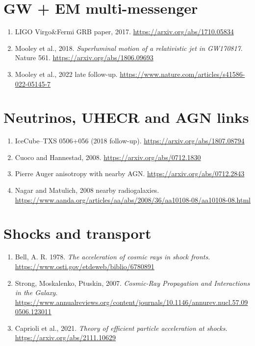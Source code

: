 \documentclass[11pt]{article}
\begin{document}
\section{GW + EM multi-messenger}
\begin{enumerate}
\item LIGO Virgo\&Fermi GRB paper, 2017. \url{https://arxiv.org/abs/1710.05834}
\item Mooley et al., 2018. \emph{Superluminal motion of a relativistic jet in GW170817}. Nature 561. \url{https://arxiv.org/abs/1806.09693}
\item Mooley et al., 2022 late follow-up. \url{https://www.nature.com/articles/s41586-022-05145-7}
\end{enumerate}

\section{Neutrinos, UHECR and AGN links}
\begin{enumerate}
\item IceCube--TXS 0506+056 (2018 follow-up). \url{https://arxiv.org/abs/1807.08794}
\item Cuoco and Hannestad, 2008. \url{https://arxiv.org/abs/0712.1830}
\item Pierre Auger anisotropy with nearby AGN. \url{https://arxiv.org/abs/0712.2843}
\item Nagar and Matulich, 2008 nearby radiogalaxies. \url{https://www.aanda.org/articles/aa/abs/2008/36/aa10108-08/aa10108-08.html}
\end{enumerate}

\section{Shocks and transport}
\begin{enumerate}
\item Bell, A. R. 1978. \emph{The acceleration of cosmic rays in shock fronts}. \url{https://www.osti.gov/etdeweb/biblio/6780891}
\item Strong, Moskalenko, Ptuskin, 2007. \emph{Cosmic-Ray Propagation and Interactions in the Galaxy}. \url{https://www.annualreviews.org/content/journals/10.1146/annurev.nucl.57.090506.123011}
\item Caprioli et al., 2021. \emph{Theory of efficient particle acceleration at shocks}. \url{https://arxiv.org/abs/2111.10629}
\end{enumerate}
\end{document}
